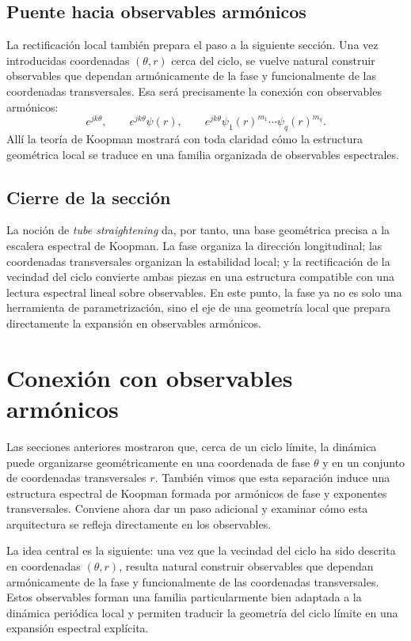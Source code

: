 \subsection{Puente hacia observables armónicos}

La rectificación local también prepara el paso a la siguiente sección. Una vez introducidas coordenadas \((\theta,r)\) cerca del ciclo, se vuelve natural construir observables que dependan armónicamente de la fase y funcionalmente de las coordenadas transversales. Esa será precisamente la conexión con observables armónicos:
\[
e^{jk\theta},\qquad
e^{jk\theta}\psi(r),\qquad
e^{jk\theta}\psi_1(r)^{m_1}\cdots\psi_q(r)^{m_q}.
\]
Allí la teoría de Koopman mostrará con toda claridad cómo la estructura geométrica local se traduce en una familia organizada de observables espectrales.

\subsection{Cierre de la sección}

La noción de \emph{tube straightening} da, por tanto, una base geométrica precisa a la escalera espectral de Koopman. La fase organiza la dirección longitudinal; las coordenadas transversales organizan la estabilidad local; y la rectificación de la vecindad del ciclo convierte ambas piezas en una estructura compatible con una lectura espectral lineal sobre observables. En este punto, la fase ya no es solo una herramienta de parametrización, sino el eje de una geometría local que prepara directamente la expansión en observables armónicos.
\section{Conexión con observables armónicos}

Las secciones anteriores mostraron que, cerca de un ciclo límite, la dinámica puede organizarse geométricamente en una coordenada de fase \(\theta\) y en un conjunto de coordenadas transversales \(r\). También vimos que esta separación induce una estructura espectral de Koopman formada por armónicos de fase y exponentes transversales. Conviene ahora dar un paso adicional y examinar cómo esta arquitectura se refleja directamente en los observables.

La idea central es la siguiente: una vez que la vecindad del ciclo ha sido descrita en coordenadas \((\theta,r)\), resulta natural construir observables que dependan armónicamente de la fase y funcionalmente de las coordenadas transversales. Estos observables forman una familia particularmente bien adaptada a la dinámica periódica local y permiten traducir la geometría del ciclo límite en una expansión espectral explícita.

